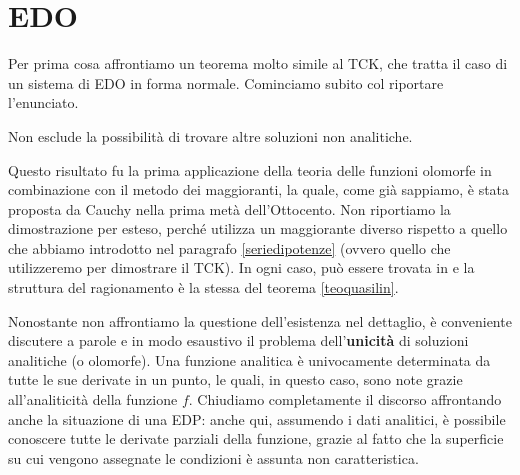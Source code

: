 \newpage
\section{EDO}

Per prima cosa affrontiamo un teorema molto simile al TCK, che tratta il caso di un sistema di EDO in forma normale.
Cominciamo subito col riportare l'enunciato.

\begin{theorem}\label{teoedo}
{
}
\end{theorem}

\begin{remark}
Non esclude la possibilità di trovare altre soluzioni non analitiche.
\end{remark}

Questo risultato fu la prima applicazione della teoria delle funzioni olomorfe in combinazione con il metodo dei maggioranti, la quale, come già sappiamo, è stata proposta da Cauchy nella prima metà dell'Ottocento.
Non riportiamo la dimostrazione per esteso, perché utilizza un maggiorante diverso rispetto a quello che abbiamo introdotto nel paragrafo \ref{seriedipotenze} (ovvero quello che utilizzeremo per dimostrare il TCK). 
In ogni caso, può essere trovata in \cite{Delf} e la struttura del ragionamento è la stessa del teorema \ref{teoquasilin}.

Nonostante non affrontiamo la questione dell'esistenza nel dettaglio, è conveniente discutere a parole e in modo esaustivo il problema dell'\textbf{unicità} di soluzioni analitiche (o olomorfe). Una funzione analitica è univocamente determinata da tutte le sue derivate in un punto, le quali, in questo caso, sono note grazie all'analiticità della funzione $f$.
Chiudiamo completamente il discorso affrontando anche la situazione di una EDP: anche qui, assumendo i dati analitici, è possibile conoscere tutte le derivate parziali della funzione, grazie al fatto che la superficie su cui vengono assegnate le condizioni è assunta non caratteristica.

